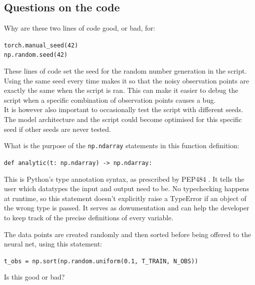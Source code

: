 \documentclass[we,twoside,openright,a4paper,11pt]{uantwerpenbamathesis}
\begin{document}
\subsection{Questions on the code}
\begin{tcolorbox}[title=Question 1, colback=blue!10!white, colframe=blue!40!white, sharp corners]
    Why are these two lines of code good, or bad, for:
    \begin{tcolorbox}[colback=gray!10!white, colframe=gray!40!white]
        \verb|torch.manual_seed(42)|\\
        \verb|np.random.seed(42)|
    \end{tcolorbox}
\end{tcolorbox}
These lines of code set the seed for the random number generation in the script. Using the same seed every time makes it so that the noisy observation points are exactly the same when the script is ran. This can make it easier to debug the script when a specific combination of observation points causes a bug.\\

It is however also important to occasionally test the script with different seeds. The model architecture and the script could become optimised for this specific seed if other seeds are never tested.

\begin{tcolorbox}[title=Question 2, colback=blue!10!white, colframe=blue!40!white, sharp corners]
    What is the purpose of the \verb|np.ndarray| statements in this function definition:
    \begin{tcolorbox}[colback=gray!10!white, colframe=gray!40!white]
        \verb|def analytic(t: np.ndarray) -> np.ndarray:|
    \end{tcolorbox}
\end{tcolorbox}

This is Python's type annotation syntax, as prescribed by PEP484 \cite{pep484}. It tells the user which datatypes the input and output need to be. No typechecking happens at runtime, so this statement doesn't explicitly raise a TypeError if an object of the wrong type is passed. It serves as dowumentation and can help the developer to keep track of the precise definitions of every variable.

\begin{tcolorbox}[title=Question 3, colback=blue!10!white, colframe=blue!40!white, sharp corners]
    The data points are created randomly and then sorted before being offered to the neural net, using this statement:
    \begin{tcolorbox}[colback=gray!10!white, colframe=gray!40!white]
        \verb|t_obs = np.sort(np.random.uniform(0.1, T_TRAIN, N_OBS))|
    \end{tcolorbox}
    Is this good or bad?
\end{tcolorbox}
\end{document}
